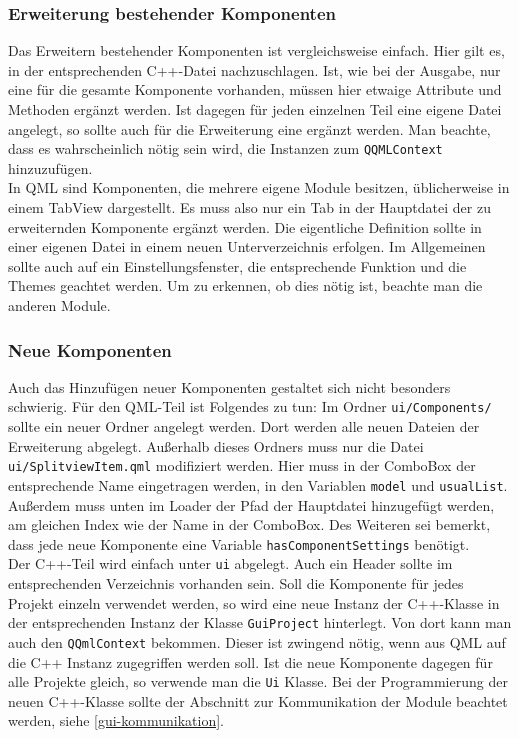 \subsubsection{Erweiterung bestehender Komponenten}
Das Erweitern bestehender Komponenten ist vergleichsweise einfach. Hier gilt es,
in der entsprechenden C++-Datei nachzuschlagen. Ist, wie bei der Ausgabe, nur
eine für die gesamte Komponente vorhanden, müssen hier etwaige Attribute und
Methoden ergänzt werden. Ist dagegen für jeden einzelnen Teil eine eigene Datei
angelegt, so sollte auch für die Erweiterung eine ergänzt werden. Man beachte,
dass es wahrscheinlich nötig sein wird, die Instanzen zum \texttt{QQMLContext}
hinzuzufügen.\\
In QML sind Komponenten, die mehrere eigene Module besitzen, üblicherweise in
einem TabView dargestellt. Es muss also nur ein Tab in der Hauptdatei der zu
erweiternden Komponente ergänzt werden. Die eigentliche Definition sollte in
einer eigenen Datei in einem neuen Unterverzeichnis erfolgen. Im Allgemeinen
sollte auch auf ein Einstellungsfenster, die entsprechende Funktion und die
Themes geachtet werden. Um zu erkennen, ob dies nötig ist, beachte man die
anderen Module.

\subsubsection{Neue Komponenten}

Auch das Hinzufügen neuer Komponenten gestaltet sich nicht besonders schwierig.
Für den QML-Teil ist Folgendes zu tun: Im Ordner \texttt{ui/Components/} sollte ein
neuer Ordner angelegt werden. Dort werden alle neuen Dateien der Erweiterung
abgelegt. Außerhalb dieses Ordners muss nur die Datei
\texttt{ui/SplitviewItem.qml} modifiziert werden. Hier muss in der ComboBox der
entsprechende Name eingetragen werden, in den Variablen \texttt{model} und
\texttt{usualList}. Außerdem muss unten im Loader der Pfad der Hauptdatei
hinzugefügt werden, am gleichen Index wie der Name in der ComboBox. Des Weiteren
sei bemerkt, dass jede neue Komponente eine Variable
\texttt{hasComponentSettings} benötigt.\\
Der C++-Teil wird einfach unter \texttt{ui} abgelegt. Auch ein Header sollte im
entsprechenden Verzeichnis vorhanden sein. Soll die Komponente für jedes Projekt
einzeln verwendet werden, so wird eine neue Instanz der C++-Klasse in der
entsprechenden Instanz der Klasse \texttt{GuiProject} hinterlegt. Von dort kann
man auch den \texttt{QQmlContext} bekommen. Dieser ist zwingend nötig, wenn aus
QML auf die C++ Instanz zugegriffen werden soll. Ist die neue Komponente dagegen
für alle Projekte gleich, so verwende man die \texttt{Ui} Klasse. Bei der
Programmierung der neuen C++-Klasse sollte der Abschnitt zur Kommunikation der
Module beachtet werden, siehe \autoref{gui-kommunikation}.
\vspace{-0.4cm}

